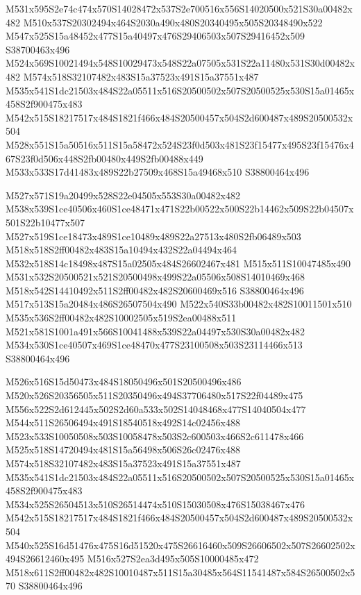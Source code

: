 \documentclass{article}
\begin{document}
\begin{multicols}{2}
M531x595S2e74c474x570S14028472x537S2e700516x556S14020500x521S30a00482x482 M510x537S20302494x464S2030a490x480S20340495x505S20348490x522 M547x525S15a48452x477S15a40497x476S29406503x507S29416452x509 S38700463x496 M524x569S10021494x548S10029473x548S22a07505x531S22a11480x531S30d00482x482 M574x518S32107482x483S15a37523x491S15a37551x487 M535x541S1dc21503x484S22a05511x516S20500502x507S20500525x530S15a01465x458S2f900475x483 M542x515S18217517x484S1821f466x484S20500457x504S2d600487x489S20500532x504 M528x551S15a50516x511S15a58472x524S23f0d503x481S23f15477x495S23f15476x467S23f0d506x448S2fb00480x449S2fb00488x449 M533x533S17d41483x489S22b27509x468S15a49468x510 S38800464x496

M527x571S19a20499x528S22e04505x553S30a00482x482 M538x539S1ce40506x460S1ce48471x471S22b00522x500S22b14462x509S22b04507x501S22b10477x507 M527x519S1ce18473x489S1ce10489x489S22a27513x480S2fb06489x503 M518x518S2ff00482x483S15a10494x432S22a04494x464 M532x518S14c18498x487S15a02505x484S26602467x481 M515x511S10047485x490 M531x532S20500521x521S20500498x499S22a05506x508S14010469x468 M518x542S14410492x511S2ff00482x482S20600469x516 S38800464x496 M517x513S15a20484x486S26507504x490 M522x540S33b00482x482S10011501x510 M535x536S2ff00482x482S10002505x519S2ea00488x511 M521x581S1001a491x566S10041488x539S22a04497x530S30a00482x482 M534x530S1ce40507x469S1ce48470x477S23100508x503S23114466x513 S38800464x496

M526x516S15d50473x484S18050496x501S20500496x486 M520x526S20356505x511S20350496x494S37706480x517S22f04489x475 M556x522S2d612445x502S2d60a533x502S14048468x477S14040504x477 M544x511S26506494x491S18540518x492S14c02456x488 M523x533S10050508x503S10058478x503S2c600503x466S2c611478x466 M525x518S14720494x481S15a56498x506S26c02476x488 M574x518S32107482x483S15a37523x491S15a37551x487 M535x541S1dc21503x484S22a05511x516S20500502x507S20500525x530S15a01465x458S2f900475x483 M534x525S26504513x510S26514474x510S15030508x476S15038467x476 M542x515S18217517x484S1821f466x484S20500457x504S2d600487x489S20500532x504 M540x525S16d51476x475S16d51520x475S26616460x509S26606502x507S26602502x494S26612460x495 M516x527S2ea3d495x505S10000485x472 M518x611S2ff00482x482S10010487x511S15a30485x564S11541487x584S26500502x570 S38800464x496


\end{multicols}
\end{document}
